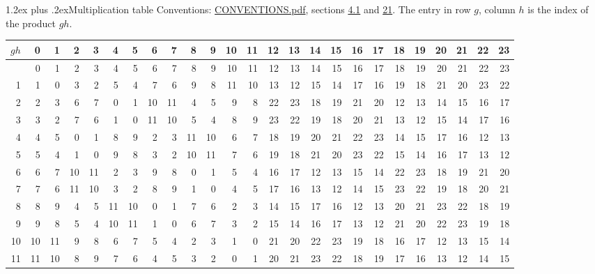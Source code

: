 \documentclass[10pt,a4paper]{article}
\makeatletter
\renewcommand\section{\@startsection{section}{1}{\z@}{-3ex plus -1ex minus -.2ex}%
  {1.2ex plus .2ex}{\normalfont\large\sffamily\bfseries\color{parttitle}}}
\numberwithin{equation}{section}
\makeatother
\begin{document}
\section{Multiplication table}\label{s:multiplication}
Conventions: \href{../../CONVENTIONS.pdf}{CONVENTIONS.pdf}, sections \href{../../../rotation/CONVENTIONS.pdf\#conv.4.1}{4.1} and \href{../../CONVENTIONS.pdf\#conv.21}{21}.
The entry in row $g$, column $h$ is the index of the product $gh$.
{\normalsize\setlength{\tabcolsep}{0.1em}\setlength{\LTleft}{-8pt plus 1fill}\setlength{\LTright}{-8pt plus 1fill}\begin{longtable}{@{}r|rrrrrrrrrrrrrrrrrrrrrrrr@{}}\toprule
$gh$ & 0 & 1 & 2 & 3 & 4 & 5 & 6 & 7 & 8 & 9 & 10 & 11 & 12 & 13 & 14 & 15 & 16 & 17 & 18 & 19 & 20 & 21 & 22 & 23\\\midrule\endhead
\bottomrule\endfoot\endlastfoot
0 & 0 & 1 & 2 & 3 & 4 & 5 & 6 & 7 & 8 & 9 & 10 & 11 & 12 & 13 & 14 & 15 & 16 & 17 & 18 & 19 & 20 & 21 & 22 & 23\\*
1 & 1 & 0 & 3 & 2 & 5 & 4 & 7 & 6 & 9 & 8 & 11 & 10 & 13 & 12 & 15 & 14 & 17 & 16 & 19 & 18 & 21 & 20 & 23 & 22\\
2 & 2 & 3 & 6 & 7 & 0 & 1 & 10 & 11 & 4 & 5 & 9 & 8 & 22 & 23 & 18 & 19 & 21 & 20 & 12 & 13 & 14 & 15 & 16 & 17\\
3 & 3 & 2 & 7 & 6 & 1 & 0 & 11 & 10 & 5 & 4 & 8 & 9 & 23 & 22 & 19 & 18 & 20 & 21 & 13 & 12 & 15 & 14 & 17 & 16\\
4 & 4 & 5 & 0 & 1 & 8 & 9 & 2 & 3 & 11 & 10 & 6 & 7 & 18 & 19 & 20 & 21 & 22 & 23 & 14 & 15 & 17 & 16 & 12 & 13\\
5 & 5 & 4 & 1 & 0 & 9 & 8 & 3 & 2 & 10 & 11 & 7 & 6 & 19 & 18 & 21 & 20 & 23 & 22 & 15 & 14 & 16 & 17 & 13 & 12\\
6 & 6 & 7 & 10 & 11 & 2 & 3 & 9 & 8 & 0 & 1 & 5 & 4 & 16 & 17 & 12 & 13 & 15 & 14 & 22 & 23 & 18 & 19 & 21 & 20\\
7 & 7 & 6 & 11 & 10 & 3 & 2 & 8 & 9 & 1 & 0 & 4 & 5 & 17 & 16 & 13 & 12 & 14 & 15 & 23 & 22 & 19 & 18 & 20 & 21\\
8 & 8 & 9 & 4 & 5 & 11 & 10 & 0 & 1 & 7 & 6 & 2 & 3 & 14 & 15 & 17 & 16 & 12 & 13 & 20 & 21 & 23 & 22 & 18 & 19\\
9 & 9 & 8 & 5 & 4 & 10 & 11 & 1 & 0 & 6 & 7 & 3 & 2 & 15 & 14 & 16 & 17 & 13 & 12 & 21 & 20 & 22 & 23 & 19 & 18\\
10 & 10 & 11 & 9 & 8 & 6 & 7 & 5 & 4 & 2 & 3 & 1 & 0 & 21 & 20 & 22 & 23 & 19 & 18 & 16 & 17 & 12 & 13 & 15 & 14\\
11 & 11 & 10 & 8 & 9 & 7 & 6 & 4 & 5 & 3 & 2 & 0 & 1 & 20 & 21 & 23 & 22 & 18 & 19 & 17 & 16 & 13 & 12 & 14 & 15\\

\end{longtable}}
\end{document}
